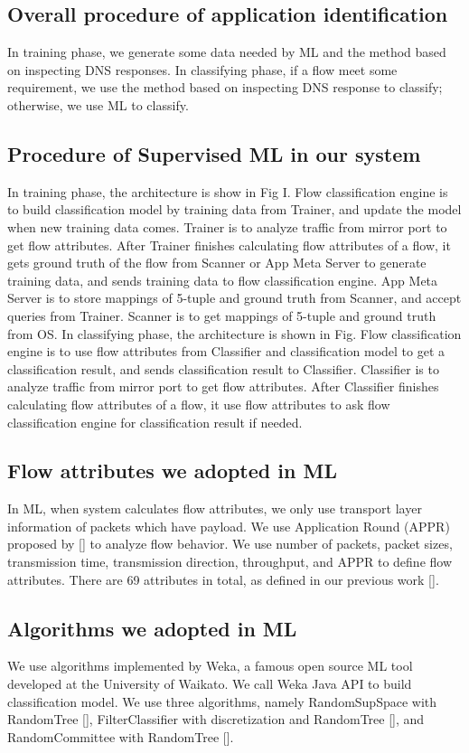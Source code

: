 \documentclass[journal]{IEEEtran}
\begin{document}
\subsection{Overall procedure of application identification}
In training phase, we generate some data needed by ML and the method based on inspecting DNS responses. In classifying phase, if a flow meet some requirement, we use the method based on inspecting DNS response to classify; otherwise, we use ML to classify.

\subsection{Procedure of Supervised ML in our system}
In training phase, the architecture is show in Fig I. Flow classification engine is to build classification model by training data from Trainer, and update the model when new training data comes. Trainer is to analyze traffic from mirror port to get flow attributes. After Trainer finishes calculating flow attributes of a flow, it gets ground truth of the flow from Scanner or App Meta Server to generate training data, and sends training data to flow classification engine. App Meta Server is to store mappings of 5-tuple and ground truth from Scanner, and accept queries from Trainer. Scanner is to get mappings of 5-tuple and ground truth from OS.
In classifying phase, the architecture is shown in Fig. Flow classification engine is to use flow attributes from Classifier and classification model to get a classification result, and sends classification result to Classifier. Classifier is to analyze traffic from mirror port to get flow attributes. After Classifier finishes calculating flow attributes of a flow, it use flow attributes to ask flow classification engine for classification result if needed.

\subsection{Flow attributes we adopted in ML}
In ML, when system calculates flow attributes, we only use transport layer information of packets which have payload. We use Application Round (APPR) proposed by [] to analyze flow behavior. We use number of packets, packet sizes, transmission time, transmission direction, throughput, and APPR to define flow attributes. There are 69 attributes in total, as defined in our previous work [].

\subsection{Algorithms we adopted in ML}
We use algorithms implemented by Weka, a famous open source ML tool developed at the University of Waikato. We call Weka Java API to build classification model. We use three algorithms, namely RandomSupSpace with RandomTree [], FilterClassifier with discretization and RandomTree [], and RandomCommittee with RandomTree [].
\end{document}
